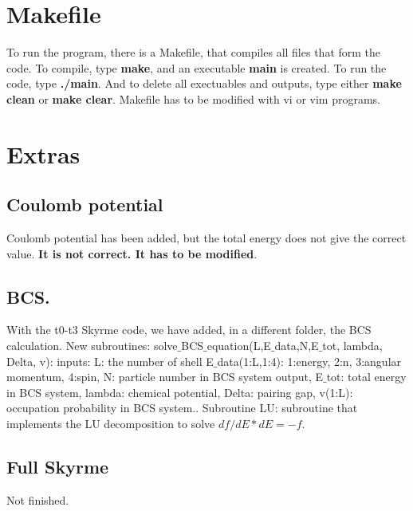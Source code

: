 \documentclass[a4paper,10pt]{article}
\begin{document}
\section{Makefile}
To run the program, there is a Makefile, that compiles all files that form the code. 
To compile, type \textbf{make}, and an executable \textbf{main} is created. To run the code, 
type \textbf{./main}. And to delete all exectuables and outputs, type either \textbf{make clean} or
\textbf{make clear}. Makefile has to be modified with vi or vim programs.

\section{Extras}
\subsection{Coulomb potential}
Coulomb potential has been added, but the total energy does not give the correct value. \textbf{It is not correct. It has to 
be modified}.
\subsection{BCS.}
With the t0-t3 Skyrme code, we have added, in a different folder, the BCS calculation. 
New subroutines: solve$\_$BCS$\_$equation(L,E$\_$data,N,E$\_$tot, lambda, Delta, v): inputs:  L: the number of shell
E$\_$data(1:L,1:4): 1:energy, 2:n, 3:angular momentum, 4:spin,
N: particle number in BCS system output,
 E$\_$tot: total energy in BCS system,
 lambda: chemical potential, 
 Delta: pairing gap, v(1:L): occupation probability in BCS system..
 Subroutine LU: subroutine that implements the LU decomposition to solve $df/dE * dE = -f$.
 
 \subsection{Full Skyrme}
 Not finished. 
\end{document}
